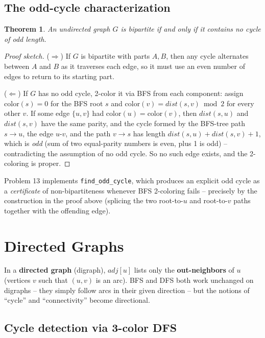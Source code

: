 \documentclass[11pt]{article}
\newtheorem{theorem}{Theorem}[section]
\begin{document}
\subsection{The odd-cycle characterization}

\begin{theorem}
\label{thm:bipartite-odd-cycle}
An undirected graph $G$ is bipartite if and only if it contains no cycle of odd length.
\end{theorem}
\begin{proof}[Proof sketch]
($\Rightarrow$) If $G$ is bipartite with parts $A, B$, then any cycle alternates between
$A$ and $B$ as it traverses each edge, so it must use an even number of edges to return to
its starting part.

($\Leftarrow$) If $G$ has no odd cycle, 2-color it via BFS from each component: assign
$\mathrm{color}(s)=0$ for the BFS root $s$ and $\mathrm{color}(v) = dist(s,v) \bmod 2$ for
every other $v$. If some edge $\{u,v\}$ had $\mathrm{color}(u) = \mathrm{color}(v)$, then
$dist(s,u)$ and $dist(s,v)$ have the same parity, and the cycle formed by the BFS-tree
path $s \to u$, the edge $u$-$v$, and the path $v \to s$ has length $dist(s,u) +
dist(s,v) + 1$, which is \emph{odd} (sum of two equal-parity numbers is even, plus 1 is
odd) -- contradicting the assumption of no odd cycle. So no such edge exists, and the
2-coloring is proper.
\end{proof}

Problem 13 implements \texttt{find\_odd\_cycle}, which produces an explicit odd cycle as
a \emph{certificate} of non-bipartiteness whenever BFS 2-coloring fails -- precisely by
the construction in the proof above (splicing the two root-to-$u$ and root-to-$v$ paths
together with the offending edge).

\section{Directed Graphs}

In a \textbf{directed graph} (digraph), $adj[u]$ lists only the \textbf{out-neighbors} of
$u$ (vertices $v$ such that $(u,v)$ is an arc). BFS and DFS both work unchanged on
digraphs -- they simply follow arcs in their given direction -- but the notions of
``cycle'' and ``connectivity'' become directional.

\subsection{Cycle detection via 3-color DFS}
\end{document}
